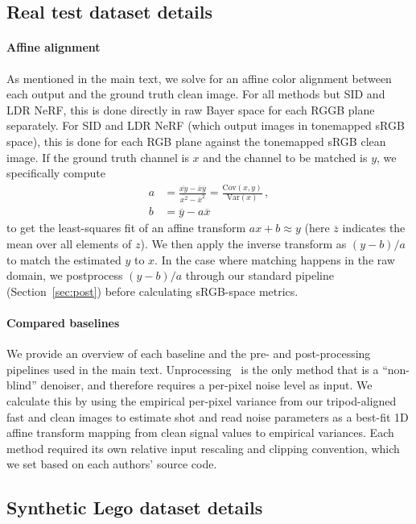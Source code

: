 \subsection{Real test dataset details}

\paragraph{Affine alignment} As mentioned in the main text, we solve for an affine color alignment between each output and the ground truth clean image. For all methods but SID and LDR NeRF, this is done directly in raw Bayer space for each RGGB plane separately. For SID and LDR NeRF (which output images in tonemapped sRGB space), this is done for each RGB plane against the tonemapped sRGB clean image. If the ground truth channel is $x$ and the channel to be matched is $y$, we specifically compute 
\begin{align}
    a &= \frac{\overline{xy} - \overline x \overline y}{\overline{x^2} - \overline x^2} = \frac{\mathrm{Cov}(x, y)}{\mathrm{Var}(x)} \, , \\
    b &= \overline y - a \overline x
\end{align}
to get the least-squares fit of an affine transform $ax+b \approx y$ (here $\overline z$ indicates the mean over all elements of $z$). We then apply the inverse transform as $(y-b)/a$ to match the estimated $y$ to $x$. In the case where matching happens in the raw domain, we postprocess $(y-b)/a$ through our standard pipeline (Section~\ref{sec:post}) before calculating sRGB-space metrics.


\paragraph{Compared baselines} We provide an overview of each baseline and the pre- and post-processing pipelines used in the main text. Unprocessing~\cite{brooks2019cvpr} is the only method that is a ``non-blind'' denoiser, and therefore requires a per-pixel noise level as input. We calculate this by using the empirical per-pixel variance from our tripod-aligned fast and clean images to estimate shot and read noise parameters as a best-fit 1D affine transform mapping from clean signal values to empirical variances. Each method required its own relative input rescaling and clipping convention, which we set based on each authors' source code. 


\subsection{Synthetic Lego dataset details}

